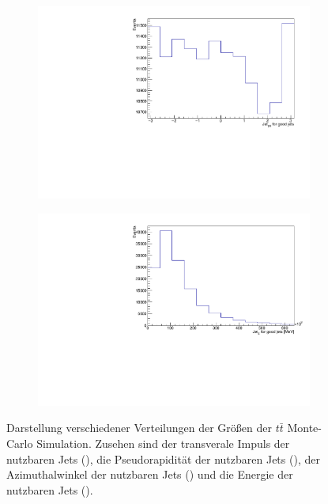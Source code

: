 \begin{figure}
\begin{subfigure}{0.5\textwidth}
    \includegraphics[width=\linewidth]{plots_and_txt/ttbar.mu_selected_/ttbar.mu_selected_jet_phi_good.pdf}
    \caption{}
    \label{fig:jet_pt_good3}
  \end{subfigure}%
  \begin{subfigure}{0.5\textwidth}
    \centering
    \includegraphics[width=\linewidth]{plots_and_txt/ttbar.mu_selected_/ttbar.mu_selected_jet_E_good.pdf}
    \caption{}
    \label{fig:met_et3}
  \end{subfigure}%
  \caption{Darstellung verschiedener Verteilungen der Größen der $t\bar{t}$ Monte-Carlo Simulation.
  Zusehen sind der transverale Impuls der nutzbaren Jets (), die Pseudorapidität der nutzbaren Jets (), der Azimuthalwinkel der nutzbaren Jets () und die Energie der nutzbaren Jets ().
  }
  \label{fig:Distributions3}
\end{figure}

